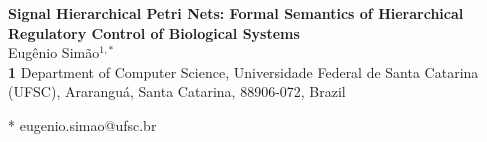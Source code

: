 \documentclass[10pt,letterpaper]{article}
\begin{document}
\vspace*{0.2in}

\begin{flushleft}
{\Large
\textbf{Signal Hierarchical Petri Nets: Formal Semantics of Hierarchical Regulatory Control of Biological Systems}
}
\newline
\\
Eug\^enio Sim\~ao$^{1,*}$
\\
\bigskip
\textbf{1} Department of Computer Science, Universidade Federal de Santa Catarina (UFSC), Ararangu\'a, Santa Catarina, 88906-072, Brazil
\\
\bigskip

* eugenio.simao@ufsc.br

\end{flushleft}

\end{document}
